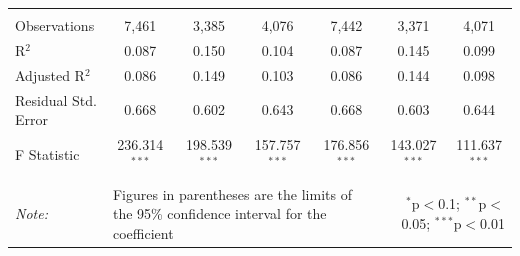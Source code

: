 \documentclass[alpha-refs]{wiley-article-01g}
\begin{document}
\begin{landscape}
\begin{table}[!htbp]
\begin{tabular}{@{\extracolsep{5pt}}lcccccc}
  & & & & & & \\ 
\hline \\[-3ex] 
Observations & 7,461 & 3,385 & 4,076 & 7,442 & 3,371 & 4,071 \\ 
R$^{2}$ & 0.087 & 0.150 & 0.104 & 0.087 & 0.145 & 0.099 \\ 
Adjusted R$^{2}$ & 0.086 & 0.149 & 0.103 & 0.086 & 0.144 & 0.098 \\ 
Residual Std. Error & 0.668 & 0.602 & 0.643 & 0.668 & 0.603 & 0.644 \\ 
F Statistic & 236.314$^{***}$ & 198.539$^{***}$ & 157.757$^{***}$ & 176.856$^{***}$ & 143.027$^{***}$ & 111.637$^{***}$ \\ 
\hline 
\hline \\[-3ex] 
\textit{Note:} &\multicolumn{4}{l}{Figures in parentheses are the limits of the 95\% confidence interval for the coefficient}  & \multicolumn{2}{r}{$^{*}$p$<$0.1; $^{**}$p$<$0.05; $^{***}$p$<$0.01} \\ 
\end{tabular} 
\end{table} 

\end{landscape}

\newpage
\end{document}
